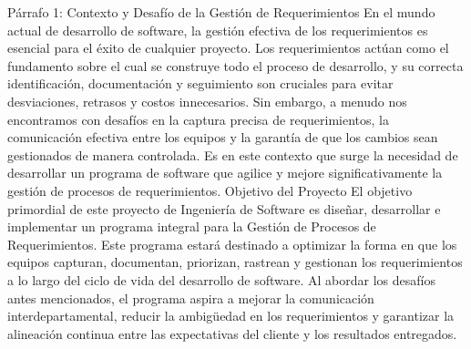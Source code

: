 Párrafo 1: Contexto y Desafío de la Gestión de Requerimientos
En el mundo actual de desarrollo de software, la gestión efectiva de los requerimientos es esencial para el éxito de cualquier proyecto. Los requerimientos actúan como el fundamento sobre el cual se construye todo el proceso de desarrollo, y su correcta identificación, documentación y seguimiento son cruciales para evitar desviaciones, retrasos y costos innecesarios. Sin embargo, a menudo nos encontramos con desafíos en la captura precisa de requerimientos, la comunicación efectiva entre los equipos y la garantía de que los cambios sean gestionados de manera controlada. Es en este contexto que surge la necesidad de desarrollar un programa de software que agilice y mejore significativamente la gestión de procesos de requerimientos.
Objetivo del Proyecto
El objetivo primordial de este proyecto de Ingeniería de Software es diseñar, desarrollar e implementar un programa integral para la Gestión de Procesos de Requerimientos. Este programa estará destinado a optimizar la forma en que los equipos capturan, documentan, priorizan, rastrean y gestionan los requerimientos a lo largo del ciclo de vida del desarrollo de software. Al abordar los desafíos antes mencionados, el programa aspira a mejorar la comunicación interdepartamental, reducir la ambigüedad en los requerimientos y garantizar la alineación continua entre las expectativas del cliente y los resultados entregados.
